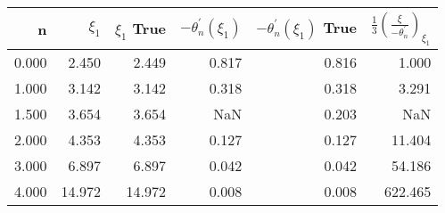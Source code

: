 \begin{tabular}{rrrrrr}
\toprule
    n &  $\xi_1$ &  $\xi_1$ True &  $-\theta_n^\prime(\xi_1)$ &  $-\theta_n^\prime(\xi_1)$ True &  $\frac{1}{3}\left(\frac{\xi}{-\theta_n^\prime}\right)_\xi_1$ \\
\midrule
0.000 &    2.450 &         2.449 &                      0.817 &                           0.816 &                                              1.000 \\
1.000 &    3.142 &         3.142 &                      0.318 &                           0.318 &                                              3.291 \\
1.500 &    3.654 &         3.654 &                        NaN &                           0.203 &                                                NaN \\
2.000 &    4.353 &         4.353 &                      0.127 &                           0.127 &                                             11.404 \\
3.000 &    6.897 &         6.897 &                      0.042 &                           0.042 &                                             54.186 \\
4.000 &   14.972 &        14.972 &                      0.008 &                           0.008 &                                            622.465 \\
\bottomrule
\end{tabular}
